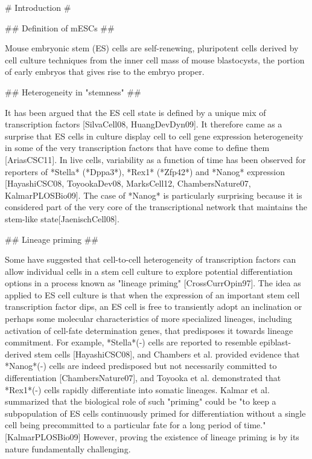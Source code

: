 \documentclass[aps,prl,twocolumn,superscriptaddress]{revtex4}
\begin{document}
\pacs{}




\maketitle



# Introduction #

## Definition of mESCs ##

Mouse embryonic stem (ES) cells are self-renewing, pluripotent cells derived by cell culture techniques from the inner cell mass of mouse blastocysts, the portion of early embryos that gives rise to the embryo proper.

## Heterogeneity in "stemness" ##

It has been argued that the ES cell state is defined by a unique mix of transcription factors [SilvaCell08, HuangDevDyn09].
It therefore came as a surprise that ES cells in culture display cell to cell gene expression heterogeneity in some of the very transcription factors that have come to define them [AriasCSC11]. In live cells, variability as a function of time has been observed for reporters of *Stella* (*Dppa3*), *Rex1* (*Zfp42*) and *Nanog* expression [HayashiCSC08, ToyookaDev08, MarksCell12, ChambersNature07, KalmarPLOSBio09]. The case of *Nanog* is particularly surprising because it is considered part of the very core of the transcriptional network that maintains the stem-like state[JaenischCell08]. 


## Lineage priming ##

Some have suggested that cell-to-cell heterogeneity of transcription factors can allow individual cells in a stem cell culture to explore potential differentiation options in a process known as "lineage priming" [CrossCurrOpin97]. The idea as applied to ES cell culture is that when the expression of an important stem cell transcription factor dips, 
an ES cell is free to transiently adopt an inclination or perhaps some molecular characteristics of more specialized lineages, including activation of cell-fate determination genes, that predisposes it towards lineage commitment.
For example, *Stella*(-) cells are reported to resemble epiblast-derived stem cells [HayashiCSC08], and Chambers et al. provided evidence that *Nanog*(-) cells are indeed predisposed but not necessarily committed to differentiation [ChambersNature07], and Toyooka et al. demonstrated that *Rex1*(-) cells rapidly differentiate into somatic lineages. Kalmar et al. summarized that the biological role of such "priming" could be "to keep a subpopulation of ES cells continuously primed for differentiation without a single cell being precommitted to a particular fate for a long period of time." [KalmarPLOSBio09] However, proving the existence of lineage priming is by its nature fundamentally challenging.
\end{document}
